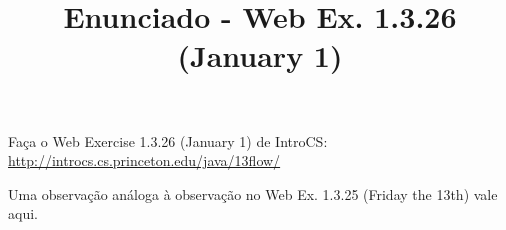 \documentclass{article}
\title{Enunciado - Web Ex. 1.3.26 (January 1)}
\date{}
\author{}
\begin{document}
\maketitle

Fa\c{c}a o Web Exercise 1.3.26 (January 1) de IntroCS:
\bigbreak
\url{http://introcs.cs.princeton.edu/java/13flow/}
\bigbreak

Uma observa\c{c}\~ao an\'aloga \`a observa\c{c}\~ao no Web Ex. 1.3.25 (Friday the 13th) vale aqui.
\end{document}
